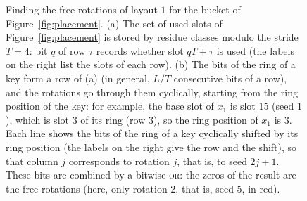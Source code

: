 \documentclass[11pt]{article}
\begin{document}
\begin{figure}[t]
\centering
{}
\caption{\label{fig:search}Finding the free rotations of layout $1$ for the
bucket of Figure~\ref{fig:placement}. (a) The set of used slots of
Figure~\ref{fig:placement} is stored by residue classes modulo the stride
$T=4$: bit $q$ of row $\tau$ records whether slot $qT+\tau$ is used (the
labels on the right list the slots of each row). (b) The bits of the ring
of a key form a row of (a) (in general, $L/T$ consecutive bits of a row),
and the rotations go through them cyclically, starting from the ring
position of the key: for example, the base slot of $x_1$ is slot $15$
(seed $1$), which is slot $3$ of its ring (row $3$), so the ring position of
$x_1$ is $3$. Each line shows the bits of the ring of a key cyclically
shifted by its ring position (the labels on the right give the row and the
shift), so that column $j$ corresponds to rotation $j$, that is, to seed
$2j+1$. These bits are combined by a bitwise \textsc{or}: the zeros of the
result are the free rotations (here, only rotation $2$, that is, seed $5$,
in red).}
\end{figure}
\end{document}
